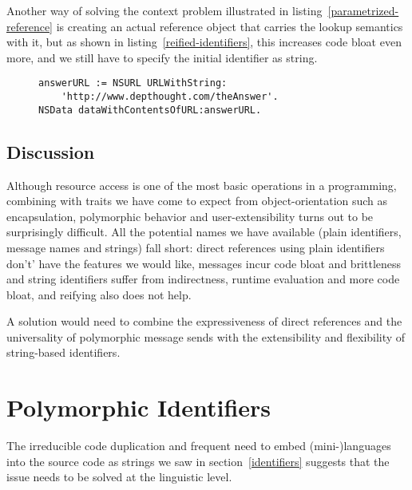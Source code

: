 \documentclass[preprint,authoryear]{acm_proc_article-sp}
\begin{document}
Another way of solving the context problem illustrated in listing~\ref{parametrized-reference} 
is creating an actual reference object that carries the lookup
semantics with it, but as shown in listing~\ref{reified-identifiers},
this increases code bloat even more, and we still have to specify the initial identifier as string.

\begin{figure}[htbp]
\begin{lstlisting}[style=numbers,label=reified-identifiers,caption=Reified identifier.]
answerURL := NSURL URLWithString:
	'http://www.depthought.com/theAnswer'.
NSData dataWithContentsOfURL:answerURL.
\end{lstlisting}
\end{figure}



\subsection{Discussion}

Although resource access is one of the most basic operations in a programming, combining
with traits we have come to expect from object-orientation such as encapsulation, polymorphic
behavior and user-extensibility turns out to be surprisingly difficult.   All the potential names
we have available (plain identifiers, message names and strings) fall short:  direct references
using plain identifiers don't' have the features we would like, messages incur code bloat
and brittleness and string identifiers suffer from indirectness, runtime evaluation and more
code bloat, and reifying also does not help.

A solution would need to combine the expressiveness of direct references and the universality
of polymorphic message sends with the extensibility and flexibility of string-based identifiers.



\section{Polymorphic Identifiers}
\label{polymorphic-identifiers}

The irreducible code duplication and frequent need to embed (mini-)languages into the
source code as strings we saw in section~\ref{identifiers} suggests that the issue needs to be
solved at the linguistic level.
\end{document}
